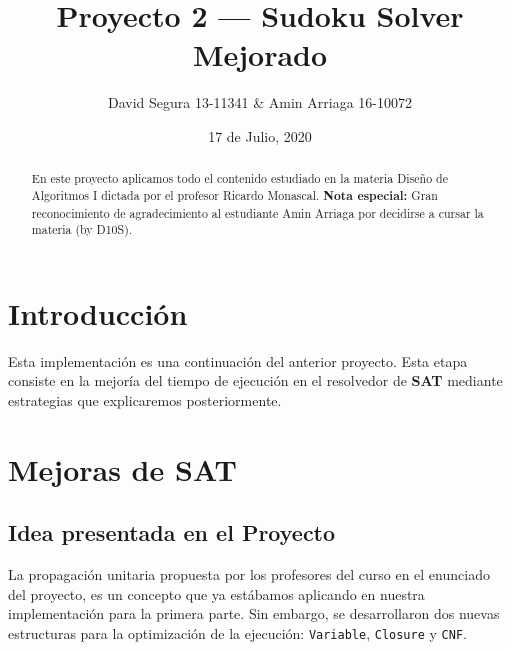 \documentclass[letterpaper,12pt]{article}
\begin{document}
\title{Proyecto 2 --- Sudoku Solver Mejorado}
\author{David Segura 13-11341 \& Amin Arriaga 16-10072}
\date{17 de Julio, 2020}
\maketitle

\begin{abstract}
En este proyecto aplicamos todo el contenido estudiado en la materia Diseño de Algoritmos I dictada por el profesor Ricardo Monascal. \textbf{Nota especial:} Gran reconocimiento de agradecimiento al estudiante Amin Arriaga por decidirse a cursar la materia (by D10S).
\end{abstract}


\section{Introducción}

Esta implementación es una continuación del anterior proyecto. Esta etapa consiste en la mejoría del tiempo de ejecución en el resolvedor de \textbf{SAT} mediante estrategias que explicaremos posteriormente.

\section{Mejoras de SAT}

\subsection{Idea presentada en el Proyecto}

La propagación unitaria propuesta por los profesores del curso en el enunciado del proyecto, es un concepto que ya estábamos aplicando en nuestra implementación para la primera parte. Sin embargo, se desarrollaron dos nuevas estructuras para la optimización de la ejecución: \texttt{Variable}, \texttt{Closure} y \texttt{CNF}.
\end{document}
